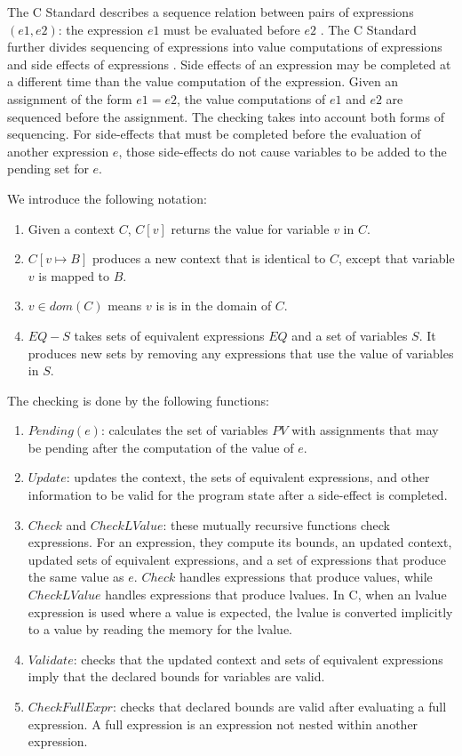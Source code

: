 The C Standard 
describes a sequence relation between pairs of expressions $(e1, e2)$:
the expression $e1$ must be evaluated before $e2$ \cite[Section 5.1.2.3]{ISO2011}.  
The C Standard
further divides sequencing of expressions into value computations
of expressions and side effects of expressions \cite[Section 6.5, pars. 1,2]{ISO2011}.
Side effects of an expression may be completed at a different time than the value
computation of the expression.
Given an assignment of the form $e1 = e2$, 
the value computations of $e1$ and $e2$ are sequenced before the
assignment. The checking takes into account both forms of sequencing.
For side-effects that must be completed before the evaluation of another
expression $e$, those side-effects do not cause variables to
be added to the pending set for $e$.

We introduce the following notation:
\begin{enumerate}
\item Given a context $C$, $C[v]$ returns the value for variable $v$ in $C$.
\item $C[v \mapsto B]$ produces a new context that is identical to $C$,
except that variable $v$ is mapped to $B$.
\item $v \in dom(C)$ means $v$ is is in the domain of $C$.
\item $EQ - S$ takes sets of equivalent expressions $EQ$  and a set of variables
$S$.  It produces new sets by removing any expressions that use the value 
of variables in $S$.
\end{enumerate}

The checking is done by the following functions:
\begin{enumerate}
\item $Pending(e)$: calculates the set of variables $PV$
with assignments that may be pending after the computation
of the value of $e$.
\item $Update$: updates the context, the sets of equivalent expressions,
and other information to be valid for the program state after
a side-effect is completed.
\item $Check$ and $CheckLValue$:  these mutually recursive
functions check expressions.  For an expression, they compute
its bounds, an updated context, updated sets of equivalent expressions,
and a set of expressions that produce the same value as $e$.
$Check$ handles expressions that
produce values, while $CheckLValue$ handles expressions that produce
lvalues.  In C, when an lvalue expression is used where a value is
expected, the lvalue is converted implicitly to a value by
reading the memory for the lvalue.
\item $Validate$: checks that the updated context
and sets of equivalent expressions imply that the declared bounds for
variables are valid.
\item $CheckFullExpr$: checks that declared bounds are valid after
evaluating a full expression.  
A full expression \cite[Annex C]{ISO2011} is an expression not nested within another expression.
\end{enumerate}

